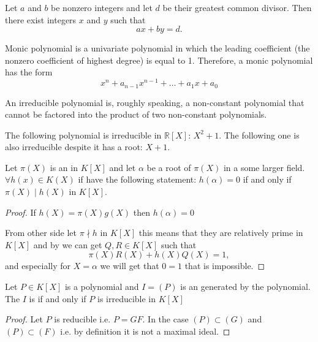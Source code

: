 \begin{appendices}
\begin{lemma}
  Let $a$ and $b$ be nonzero integers and let $d$ be their greatest common
  divisor. Then there exist integers $x$ and $y$ such that 
  \[
  a x + by = d.
  \]
  \label{lem:bezout}
\end{lemma}

\begin{definition}
  Monic polynomial is a univariate polynomial in which the leading
  coefficient (the nonzero coefficient of highest degree) is equal to
  1. Therefore, a monic polynomial has the form
  \[
  x^n + a_{n-1}x^{n-1}+ \dots + a_1 x + a_0
  \]
  \label{def:monicpolynomial}
\end{definition}

\begin{definition}
  An irreducible polynomial is, roughly speaking, a non-constant
  polynomial that cannot be factored into the product of two
  non-constant polynomials.
  \label{def:irreducible}
\end{definition}

\begin{example}
  The following polynomial is irreducible in
  $\mathbb{R}\left[X\right]$: $X^2 + 1$. The following one is also
  irreducible despite it has a root: $X+1$.
  \label{ex:irreducible}
\end{example}

\begin{theorem}
  Let $\pi(X)$ is an  in $K\left[X\right]$ and let
  $\alpha$ be a root of $\pi(X)$ in a some larger field.
  $\forall h(x) \in K\left(X\right)$ if have the following statement:
  $h\left(\alpha\right) = 0$ if and only if $\pi(X) \mid h(X)$ in
  $K\left[X\right]$.
  \begin{proof}
    If $h(X) = \pi(X) g(X)$ then $h(\alpha) = 0$

    From other side let $\pi \nmid h$ in $K\left[X\right]$ this means
    that they are relatively prime in $K\left[X\right]$ and by
     we can get $Q,R \in K\left[X\right]$ such
    that
    \[
    \pi(X) R(X) + h(X) Q(X) = 1,
    \]
    and especially for $X = \alpha$ we will get that $0 = 1$ that is
    impossible. 
  \end{proof}
  \label{thm:irreduciblediv}
\end{theorem}

\begin{theorem}
  Let $P \in K\left[X\right]$ is a polynomial and $I = \left(P\right)$ is
  an  generated by the polynomial. The $I$ is
   if and only if $P$ is irreducible in
  $K\left[X\right]$
  \begin{proof}
    Let $P$ is reducible i.e. $P = G F$. In the case $(P) \subset (G)$
    and $(P) \subset (F)$ i.e. by definition it is not a maximal
    ideal.


\end{proof}
\end{theorem}
\end{appendices}
